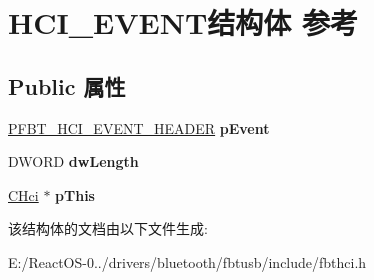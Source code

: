 \hypertarget{struct_h_c_i___e_v_e_n_t}{}\section{H\+C\+I\+\_\+\+E\+V\+E\+N\+T结构体 参考}
\label{struct_h_c_i___e_v_e_n_t}
\subsection*{Public 属性}
\begin{DoxyCompactItemize}
\item 
\mbox{\label{struct_h_c_i___e_v_e_n_t_a6e6154cc6548df611be38edd16e488ca}} 
\hyperlink{struct_f_b_t___h_c_i___e_v_e_n_t___h_e_a_d_e_r}{P\+F\+B\+T\+\_\+\+H\+C\+I\+\_\+\+E\+V\+E\+N\+T\+\_\+\+H\+E\+A\+D\+ER} {\bfseries p\+Event}
\item 
\mbox{\label{struct_h_c_i___e_v_e_n_t_a7e263c6e9aa73d9e73df5cc83b1acc47}} 
D\+W\+O\+RD {\bfseries dw\+Length}
\item 
\mbox{\label{struct_h_c_i___e_v_e_n_t_a2f79a756bb6b384dad705d785d0acbe2}} 
\hyperlink{class_c_hci}{C\+Hci} $\ast$ {\bfseries p\+This}
\end{DoxyCompactItemize}


该结构体的文档由以下文件生成\+:\begin{DoxyCompactItemize}
\item 
E\+:/\+React\+O\+S-\/0../drivers/bluetooth/fbtusb/include/fbthci.\+h\end{DoxyCompactItemize}
